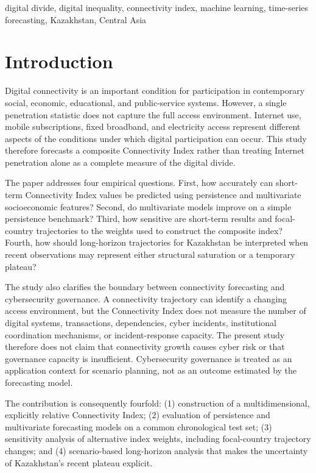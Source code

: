 \documentclass[conference]{IEEEtran}
\begin{document}
\begin{IEEEkeywords}
digital divide, digital inequality, connectivity index, machine learning, time-series forecasting, Kazakhstan, Central Asia
\end{IEEEkeywords}

\section{Introduction}

Digital connectivity is an important condition for participation in contemporary social, economic, educational, and public-service systems. However, a single penetration statistic does not capture the full access environment. Internet use, mobile subscriptions, fixed broadband, and electricity access represent different aspects of the conditions under which digital participation can occur. This study therefore forecasts a composite Connectivity Index rather than treating Internet penetration alone as a complete measure of the digital divide.

The paper addresses four empirical questions. First, how accurately can short-term Connectivity Index values be predicted using persistence and multivariate socioeconomic features? Second, do multivariate models improve on a simple persistence benchmark? Third, how sensitive are short-term results and focal-country trajectories to the weights used to construct the composite index? Fourth, how should long-horizon trajectories for Kazakhstan be interpreted when recent observations may represent either structural saturation or a temporary plateau?

The study also clarifies the boundary between connectivity forecasting and cybersecurity governance. A connectivity trajectory can identify a changing access environment, but the Connectivity Index does not measure the number of digital systems, transactions, dependencies, cyber incidents, institutional coordination mechanisms, or incident-response capacity. The present study therefore does not claim that connectivity growth causes cyber risk or that governance capacity is insufficient. Cybersecurity governance is treated as an application context for scenario planning, not as an outcome estimated by the forecasting model.

The contribution is consequently fourfold: (1) construction of a multidimensional, explicitly relative Connectivity Index; (2) evaluation of persistence and multivariate forecasting models on a common chronological test set; (3) sensitivity analysis of alternative index weights, including focal-country trajectory changes; and (4) scenario-based long-horizon analysis that makes the uncertainty of Kazakhstan's recent plateau explicit.
\end{document}
